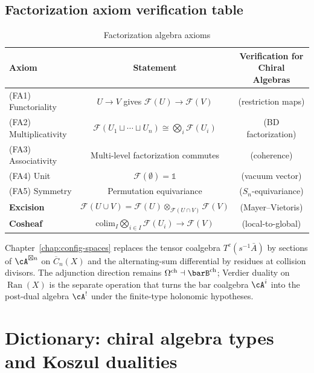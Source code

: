\subsection{Factorization axiom verification table}

\begin{table}[H]
\centering
\caption{Factorization algebra axioms}
\begin{tabular}{|l|c|c|}
\hline
\textbf{Axiom} & \textbf{Statement} & \textbf{Verification for Chiral Algebras} \\
\hline
(FA1) Functoriality & $U \to V$ gives $\mathcal{F}(U) \to \mathcal{F}(V)$ &
 (restriction maps) \\
\hline
(FA2) Multiplicativity & $\mathcal{F}(U_1 \sqcup \cdots \sqcup U_n) \cong
\bigotimes_i \mathcal{F}(U_i)$ & (BD factorization) \\
\hline
(FA3) Associativity & Multi-level factorization commutes & (coherence) \\
\hline
(FA4) Unit & $\mathcal{F}(\emptyset) = \mathbb{1}$ & (vacuum vector) \\
\hline
(FA5) Symmetry & Permutation equivariance & ($S_n$-equivariance) \\
\hline
\textbf{Excision} & $\mathcal{F}(U \cup V) = \mathcal{F}(U) \otimes_{\mathcal{F}(U \cap V)}
\mathcal{F}(V)$ & (Mayer--Vietoris) \\
\hline
\textbf{Cosheaf} & $\text{colim}_I \bigotimes_{i \in I} \mathcal{F}(U_i) \to
\mathcal{F}(V)$ & (local-to-global) \\
\hline
\end{tabular}
\end{table}

Chapter~\ref{chap:config-spaces} replaces the tensor coalgebra
$T^c(s^{-1}\bar{A})$ by sections of $\cA^{\boxtimes n}$ on
$\overline{C}_n(X)$ and the alternating-sum differential by
residues at collision divisors. The adjunction direction remains
$\Omega^{\mathrm{ch}}\dashv \barB^{\mathrm{ch}}$; Verdier
duality on $\operatorname{Ran}(X)$ is the separate operation that
turns the bar coalgebra $\cA^i$ into the post-dual algebra
$\cA^!$ under the finite-type holonomic hypotheses.



\section{Dictionary: chiral algebra types and Koszul dualities}
\label{sec:dictionary}

